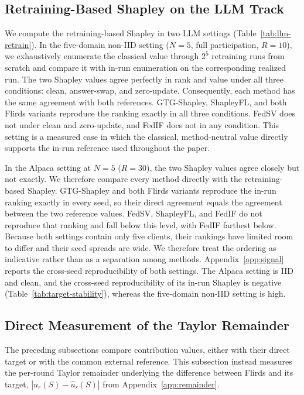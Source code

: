 \documentclass[letterpaper]{article} %
\theoremstyle{definition}
\begin{document}
\subsection{Retraining-Based Shapley on the LLM Track}
\label{app:llm-fidelity}

We compute the retraining-based Shapley in two LLM settings
(Table~\ref{tab:llm-retrain}). In the five-domain non-IID setting
($N{=}5$, full participation, $R{=}10$), we exhaustively enumerate the
classical value through $2^5$ retraining runs from scratch and compare it with
in-run enumeration on the corresponding realized run. The two Shapley values
agree perfectly in rank and value under all three conditions: clean,
answer-swap, and zero-update. Consequently, each method has the same agreement
with both references. GTG-Shapley, ShapleyFL, and both Flirds variants
reproduce the ranking exactly in all three conditions. FedSV does not under
clean and zero-update, and FedIF does not in any condition. This setting is a
measured case in which the classical, method-neutral value directly supports
the in-run reference used throughout the paper.

In the Alpaca setting at $N{=}5$ ($R{=}30$), the two Shapley values agree
closely but not exactly. We therefore compare every method directly with the
retraining-based Shapley. GTG-Shapley and both Flirds variants reproduce the
in-run ranking exactly in every seed, so their direct agreement equals the
agreement between the two reference values. FedSV, ShapleyFL, and FedIF do not
reproduce that ranking and fall below this level, with FedIF farthest below.
Because both settings contain only five clients, their rankings have limited
room to differ and their seed spreads are wide. We therefore treat the
ordering as indicative rather than as a separation among methods.
Appendix~\ref{app:signal} reports the cross-seed reproducibility of both
settings. The Alpaca setting is IID and clean, and the cross-seed
reproducibility of its in-run Shapley is negative
(Table~\ref{tab:target-stability}), whereas the five-domain non-IID setting is
high.

\subsection{Direct Measurement of the Taylor Remainder}
\label{app:remainder-measured}

The preceding subsections compare contribution values, either with their
direct target or with the common external reference.
This subsection instead measures the per-round Taylor
remainder underlying the difference between
Flirds and its target,
$|u_r(S) - \hat u_r(S)|$ from Appendix~\ref{app:remainder}.
\end{document}
